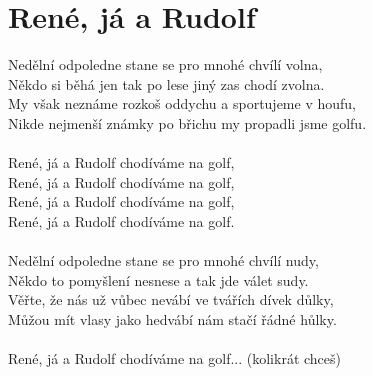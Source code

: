 \section{René, já a Rudolf}
Nedělní odpoledne stane se pro mnohé chvílí volna,\\
Někdo si běhá jen tak po lese jiný zas chodí zvolna.\\
My však neznáme rozkoš oddychu a sportujeme v houfu,\\
Nikde nejmenší známky po břichu my propadli jsme golfu.\\
\\
René, já a Rudolf chodíváme na golf,\\
René, já a Rudolf chodíváme na golf,\\
René, já a Rudolf chodíváme na golf,\\
René, já a Rudolf chodíváme na golf.\\
\\
Nedělní odpoledne stane se pro mnohé chvílí nudy,\\
Někdo to pomyšlení nesnese a tak jde válet sudy.\\
Věřte, že nás už vůbec nevábí ve tvářích dívek důlky,\\
Můžou mít vlasy jako hedvábí nám stačí řádné hůlky.\\
\\
René, já a Rudolf chodíváme na golf... (kolikrát chceš)\\